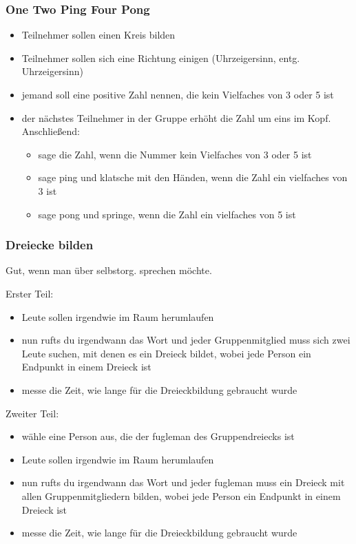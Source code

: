 \subsubsection{One Two Ping Four Pong}
\begin{itemize}
  \item Teilnehmer sollen einen Kreis bilden
  \item Teilnehmer sollen sich eine Richtung einigen (Uhrzeigersinn, entg. Uhrzeigersinn)
  \item jemand soll eine positive Zahl nennen, die kein Vielfaches von 3 oder 5 ist
  \item der nächstes Teilnehmer in der Gruppe erhöht die Zahl um eins im Kopf.
    Anschließend:
    \begin{itemize}
      \item sage die Zahl, wenn die Nummer kein Vielfaches von 3 oder 5 ist
      \item sage ping und klatsche mit den Händen, wenn die Zahl ein
        vielfaches von 3 ist
      \item sage pong und springe, wenn die Zahl ein
        vielfaches von 5 ist
    \end{itemize}
\end{itemize}


\subsubsection{Dreiecke bilden}
Gut, wenn man über selbstorg. sprechen möchte.

Erster Teil:
\begin{itemize}
  \item Leute sollen irgendwie im Raum herumlaufen
  \item nun rufts du irgendwann das Wort  und jeder Gruppenmitglied muss sich
    zwei Leute suchen, mit denen es ein Dreieck bildet, wobei jede Person ein Endpunkt in
    einem Dreieck ist
  \item messe die Zeit, wie lange für die Dreieckbildung gebraucht wurde
\end{itemize}

Zweiter Teil:
\begin{itemize}
  \item wähle eine Person aus, die der fugleman des Gruppendreiecks ist
  \item Leute sollen irgendwie im Raum herumlaufen
  \item nun rufts du irgendwann das Wort  und jeder fugleman muss
    ein Dreieck mit allen Gruppenmitgliedern bilden, wobei jede Person ein
    Endpunkt in einem Dreieck ist
  \item messe die Zeit, wie lange für die Dreieckbildung gebraucht wurde
\end{itemize}


